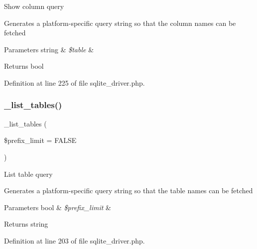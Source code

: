 Show column query

Generates a platform-\/specific query string so that the column names can be fetched


\begin{DoxyParams}[1]{Parameters}
string & {\em \$table} & \\
\hline
\end{DoxyParams}
\begin{DoxyReturn}{Returns}
bool 
\end{DoxyReturn}


Definition at line 225 of file sqlite\+\_\+driver.\+php.

\mbox{\label{class_c_i___d_b__sqlite__driver_a435c0f3ce54fe7daa178baa8532ebd54}} 
\subsubsection{\texorpdfstring{\_list\_tables()}{\_list\_tables()}}
{\footnotesize\ttfamily \+\_\+list\+\_\+tables (\begin{DoxyParamCaption}\item[{}]{\$prefix\+\_\+limit = {\ttfamily FALSE} }\end{DoxyParamCaption})\hspace{0.3cm}{\ttfamily [protected]}}

List table query

Generates a platform-\/specific query string so that the table names can be fetched


\begin{DoxyParams}[1]{Parameters}
bool & {\em \$prefix\+\_\+limit} & \\
\hline
\end{DoxyParams}
\begin{DoxyReturn}{Returns}
string 
\end{DoxyReturn}


Definition at line 203 of file sqlite\+\_\+driver.\+php.

\mbox{\label{class_c_i___d_b__sqlite__driver_ae0adf73984daf2d42ad29b66c484c82b}} 
